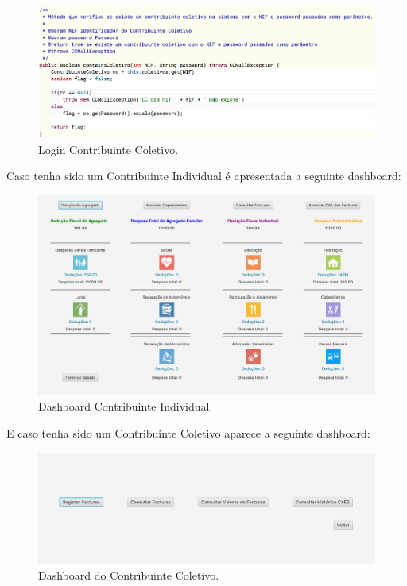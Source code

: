 \documentclass[a4paper]{article}
\begin{document}
\begin{itemize}
\begin{figure}[H]
\centering
\includegraphics[scale=0.40]{imgs/logincoletivo.png}
\caption{Login Contribuinte Coletivo.}
\label{img:logincoletivo}
\end{figure}

Caso tenha sido um Contribuinte Individual é apresentada a seguinte dashboard:
\begin{figure}[H]
\centering
\includegraphics[scale=0.35]{imgs/dashboardindividual.png}
\caption{Dashboard Contribuinte Individual.}
\label{img:dashboardindividual}
\end{figure}


E caso tenha sido um Contribuinte Coletivo aparece a seguinte dashboard:
\begin{figure}[H]
\centering
\includegraphics[scale=0.40]{imgs/dashboardcoletivo.png}
\caption{Dashboard do Contribuinte Coletivo.}
\label{img:dashboardcoletivo}
\end{figure}



\end{itemize}
\end{document}
